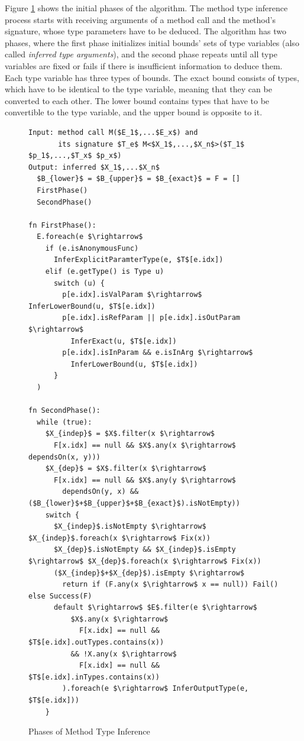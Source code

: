 Figure \ref{img10:methodTypeInference1} shows the initial phases of the algorithm. 
The method type inference process starts with receiving arguments of a method call and the method’s signature, whose type parameters have to be deduced. 
The algorithm has two phases, where the first phase initializes initial bounds’ sets of type variables (also called \textit{inferred type arguments}), and the second phase repeats until all type variables are fixed or fails if there is insufficient information to deduce them. 
Each type variable has three types of bounds. 
The exact bound consists of types, which have to be identical to the type variable, meaning that they can be converted to each other. 
The lower bound contains types that have to be convertible to the type variable, and the upper bound is opposite to it.
\begin{figure}[h!]
\begin{lstlisting}[style=myAlgo, mathescape=true]
Input: method call M($E_1$,...$E_x$) and 
       its signature $T_e$ M<$X_1$,...,$X_n$>($T_1$ $p_1$,...,$T_x$ $p_x$)
Output: inferred $X_1$,...$X_n$
  $B_{lower}$ = $B_{upper}$ = $B_{exact}$ = F = []
  FirstPhase()
  SecondPhase()

fn FirstPhase():
  E.foreach(e $\rightarrow$  
    if (e.isAnonymousFunc)
      InferExplicitParamterType(e, $T$[e.idx])
    elif (e.getType() is Type u)
      switch (u) {
        p[e.idx].isValParam $\rightarrow$ InferLowerBound(u, $T$[e.idx])
        p[e.idx].isRefParam || p[e.idx].isOutParam $\rightarrow$ 
          InferExact(u, $T$[e.idx])
        p[e.idx].isInParam && e.isInArg $\rightarrow$ 
          InferLowerBound(u, $T$[e.idx])
      }
  )
  
fn SecondPhase():
  while (true):
    $X_{indep}$ = $X$.filter(x $\rightarrow$ 
      F[x.idx] == null && $X$.any(x $\rightarrow$ dependsOn(x, y)))
    $X_{dep}$ = $X$.filter(x $\rightarrow$
      F[x.idx] == null && $X$.any(y $\rightarrow$ 
        dependsOn(y, x) && ($B_{lower}$+$B_{upper}$+$B_{exact}$).isNotEmpty))
    switch {
	  $X_{indep}$.isNotEmpty $\rightarrow$ $X_{indep}$.foreach(x $\rightarrow$ Fix(x))     
	  $X_{dep}$.isNotEmpty && $X_{indep}$.isEmpty $\rightarrow$ $X_{dep}$.foreach(x $\rightarrow$ Fix(x))
	  ($X_{indep}$+$X_{dep}$).isEmpty $\rightarrow$ 
	    return if (F.any(x $\rightarrow$ x == null)) Fail() else Success(F)
	  default $\rightarrow$ $E$.filter(e $\rightarrow$ 
	      $X$.any(x $\rightarrow$ 
	        F[x.idx] == null && $T$[e.idx].outTypes.contains(x)) 
	      && !X.any(x $\rightarrow$ 
	        F[x.idx] == null && $T$[e.idx].inTypes.contains(x))
	    ).foreach(e $\rightarrow$ InferOutputType(e, $T$[e.idx]))
    }
\end{lstlisting}
\caption{Phases of Method Type Inference}
\label{img10:methodTypeInference1}
\end{figure}
